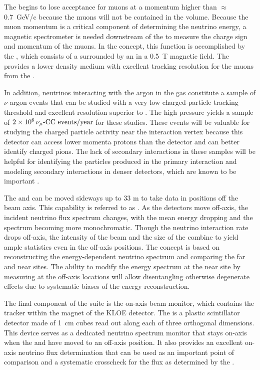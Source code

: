 The  begins to lose acceptance for muons at a momentum higher than 
$\approx$0.7~GeV/c because the muons will not be contained in the  volume.  Because the muon momentum is a critical component of determining the neutrino energy, a magnetic spectrometer is needed downstream of the  to measure the charge sign and momentum of the muons.  In the   concept, this function is accomplished by the , which consists of a  surrounded by an  in a \SI{0.5}{T} magnetic field. The  provides a lower density medium with excellent tracking resolution for the muons from the .  

In addition, neutrinos interacting with the argon in the gas  constitute a sample of $\nu$-argon events that can be studied with a very low charged-particle tracking threshold and excellent resolution superior to . The high pressure yields a sample of 
$\num{2e6}\,{\nu_\mu \text{-CC events/year}}$ for these studies. These events will be valuable for studying the charged particle activity near the interaction vertex because this detector can access lower momenta protons than the  detector and can better identify charged pions.  The lack of secondary interactions in these samples will be helpful for identifying the particles produced in the primary interaction and modeling secondary interactions in denser detectors, which are known to be important \cite{Friedland:2018vry}.

The  and  can be moved sideways up to 33 m to take data in positions off the beam axis.  This capability is referred to as . As the detectors move off-axis, the incident neutrino flux spectrum changes, with the mean energy dropping and the spectrum becoming more monochromatic.  Though the neutrino interaction rate drops off-axis, the intensity of the beam and the size of the   combine to yield ample statistics even in the off-axis positions.
The  concept is based on reconstructing the energy-dependent neutrino spectrum and
comparing the far and near sites. The ability to modify the energy spectrum at the near site by measuring at the off-axis locations will allow disentangling otherwise degenerate effects due to systematic biases of the energy reconstruction.

The final component of the   suite is the on-axis beam monitor, which contains the
 tracker within the magnet of the KLOE detector.  The  is a plastic scintillator detector made of \SI{1}{cm} cubes read out along each of three orthogonal dimensions.  
This device serves as a dedicated  neutrino spectrum monitor that stays on-axis  when the  and  have moved to an off-axis position. 
It also provides an excellent on-axis neutrino flux determination that can be used as an important point of comparison and a systematic crosscheck for the flux as determined by the .

